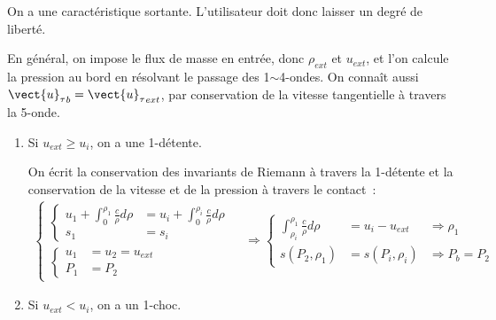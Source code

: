 On a une caractéristique sortante.
L'utilisateur doit donc laisser un degré de liberté.

En général, on impose le flux de masse en entrée, donc $\rho_{ext}$
et $u_{ext}$, et l'on calcule la pression au bord en résolvant
le passage des 1$\sim$4-ondes.
On connaît aussi ${\vect{u}_\tau}_b = {\vect{u}_\tau}_{ext}$,
par conservation de la vitesse tangentielle à travers la 5-onde.

\begin{enumerate}

\item Si $u_{ext} \geqslant u_i$,
on a une 1-détente.

On écrit la conservation
des invariants de Riemann à travers la 1-détente
et la conservation de la vitesse et de la pression à travers le contact~:
\begin{equation}
\begin{aligned}
\left\{
\begin{aligned}
\left\{
\begin{aligned}
u_1 + \displaystyle\int_0^{\rho_1} \frac{c}{\rho} d\rho
&= u_i + \displaystyle\int_0^{\rho_i} \frac{c}{\rho} d\rho\\[0.5em]
s_1 &= s_i
\end{aligned}
\right.\\[1em]
\left\{
\begin{aligned}
u_1 &= u_2 = u_{ext}\\[0.5em]
P_1 &= P_2
\end{aligned}
\right.
\end{aligned}
\right.
&\Rightarrow
\left\{
\begin{aligned}
\displaystyle\int_{\rho_i}^{\rho_1} \frac{c}{\rho} d\rho
&= u_i - u_{ext}
&\Rightarrow \rho_1\\[0.5em]
s(P_2,\rho_1) &= s(P_i,\rho_i)
&\Rightarrow P_b = P_2
\end{aligned}
\right.
\end{aligned}
\end{equation}

\item Si $u_{ext} < u_i$,
on a un 1-choc.


\end{enumerate}
